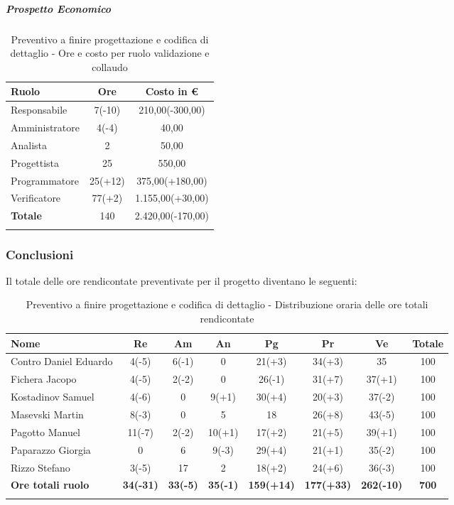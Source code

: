 \documentclass[../piano_di_progetto.tex]{subfiles}
\begin{document}
\subparagraph{Prospetto Economico}

\begin{center}
	\begin{longtable}{|l|c|c|}
		\hline
		\rowcolor{lightgray}
		\textbf{Ruolo} & \textbf{Ore} & \textbf{Costo in €}\\

		\hline
		Responsabile & 7(-10) & 210,00(-300,00)\\
		Amministratore & 4(-4) & 40,00\\
		Analista & 2 & 50,00\\
		Progettista & 25 & 550,00\\
		Programmatore & 25(+12) & 375,00(+180,00)\\
		Verificatore & 77(+2) & 1.155,00(+30,00)\\
		\hline
		\textbf{Totale} & 140 & 2.420,00(-170,00)\\
		\hline
		\rowcolor{white}
		\caption{Preventivo a finire progettazione e codifica di dettaglio - Ore e costo per ruolo validazione e collaudo}
	\end{longtable}
\end{center}


\subsubsection{Conclusioni}%
\label{sub:cons_con_4}
Il totale delle ore rendicontate preventivate per il progetto diventano le seguenti:
\begin{center}
	\begin{longtable}{|l|c|c|c|c|c|c|c|}
		\hline
		\rowcolor{lightgray}
		\textbf{Nome} & \textbf{Re} & \textbf{Am} & \textbf{An} & \textbf{Pg}  & \textbf{Pr}   & \textbf{Ve} & \textbf{Totale} \\

		\hline
			Contro Daniel Eduardo & 4(-5) & 6(-1) & 0 & 21(+3) & 34(+3) & 35 & 100 \\
			Fichera Jacopo & 4(-5) & 2(-2) & 0 & 26(-1) & 31(+7) & 37(+1) & 100 \\
			Kostadinov Samuel & 4(-6) & 0 & 9(+1) & 30(+4) & 20(+3) & 37(-2) & 100 \\		
			Masevski Martin & 8(-3) & 0 & 5 & 18 & 26(+8) & 43(-5) & 100 \\
			Pagotto Manuel & 11(-7) & 2(-2) & 10(+1) & 17(+2) & 21(+5) & 39(+1) & 100 \\			
			Paparazzo Giorgia & 0 & 6 & 9(-3) & 29(+4) & 21(+1) & 35(-2) & 100 \\
			Rizzo Stefano & 3(-5) & 17 & 2 & 18(+2) & 24(+6) & 36(-3) & 100 \\
			\hline
			\textbf{Ore totali ruolo} & \textbf{34(-31)} & \textbf{33(-5)} & \textbf{35(-1)} & \textbf{159(+14)} & \textbf{177(+33)} & \textbf{262(-10)} & \textbf{700} \\
		\hline	
		\rowcolor{white}
		\caption{Preventivo a finire progettazione e codifica di dettaglio - Distribuzione oraria delle ore totali rendicontate}
	\end{longtable}
\end{center}
\end{document}

